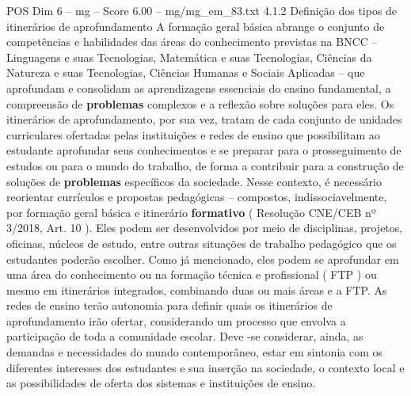 \begin{textsample}{POS Dim 6 – mg – Score 6.00 – mg/mg\_em\_83.txt}  \label{ex:f6_pos_249}
4.1.2 Definição dos tipos de itinerários de aprofundamento A formação geral básica abrange o conjunto de competências e habilidades das áreas do conhecimento previstas na BNCC – Linguagens e suas Tecnologias, Matemática e suas Tecnologias, Ciências da Natureza e suas Tecnologias, Ciências Humanas e Sociais Aplicadas – que aprofundam e consolidam as aprendizagens essenciais do ensino fundamental, a compreensão de \textbf{problemas} complexos e a reflexão sobre soluções para eles.
Os itinerários de aprofundamento, por sua vez, tratam de cada conjunto de unidades curriculares ofertadas pelas instituições e redes de ensino que possibilitam ao estudante aprofundar seus conhecimentos e se preparar para o prosseguimento de estudos ou para o mundo do trabalho, de forma a contribuir para a construção de soluções de \textbf{problemas} específicos da sociedade.
Nesse contexto, é necessário reorientar currículos e propostas pedagógicas – compostos, indissociavelmente, por formação geral básica e itinerário \textbf{formativo} ( Resolução CNE/CEB nº 3/2018, Art. 10 ).
Eles podem ser desenvolvidos por meio de disciplinas, projetos, oficinas, núcleos de estudo, entre outras situações de trabalho pedagógico que os estudantes poderão escolher.
Como já mencionado, eles podem se aprofundar em uma área do conhecimento ou na formação técnica e profissional ( FTP ) ou mesmo em itinerários integrados, combinando duas ou mais áreas e a FTP.
As redes de ensino terão autonomia para definir quais os itinerários de aprofundamento irão ofertar, considerando um processo que envolva a participação de toda a comunidade escolar.
Deve -se considerar, ainda, as demandas e necessidades do mundo contemporâneo, estar em sintonia com os diferentes interesses dos estudantes e sua inserção na sociedade, o contexto local e as possibilidades de oferta dos sistemas e instituições de ensino.

\end{textsample}
